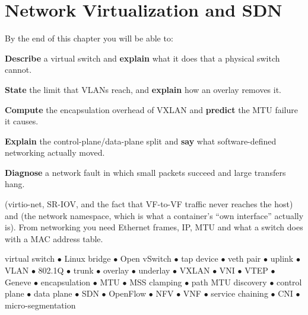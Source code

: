\chapter{Network Virtualization and SDN}\label{ch:network}

\begin{outcomes}
By the end of this chapter you will be able to:
\begin{tight}
  \item \textbf{Describe} a virtual switch and \textbf{explain} what it does
        that a physical switch cannot.
  \item \textbf{State} the limit that VLANs reach, and \textbf{explain} how an
        overlay removes it.
  \item \textbf{Compute} the encapsulation overhead of VXLAN and
        \textbf{predict} the MTU failure it causes.
  \item \textbf{Explain} the control-plane/data-plane split and \textbf{say}
        what software-defined networking actually moved.
  \item \textbf{Diagnose} a network fault in which small packets succeed and
        large transfers hang.
\end{tight}
\end{outcomes}

\begin{prereq}
 (virtio-net, SR-IOV, and the fact that VF-to-VF traffic never
reaches the host) and  (the network namespace, which is what
a container's ``own interface'' actually is). From networking you need Ethernet
frames, IP, MTU and what a switch does with a MAC address table.
\end{prereq}

\begin{keyterms}
virtual switch $\bullet$ Linux bridge $\bullet$ Open vSwitch $\bullet$ tap
device $\bullet$ veth pair $\bullet$ uplink $\bullet$ VLAN $\bullet$ 802.1Q
$\bullet$ trunk $\bullet$ overlay $\bullet$ underlay $\bullet$ VXLAN $\bullet$
VNI $\bullet$ VTEP $\bullet$ Geneve $\bullet$ encapsulation $\bullet$ MTU
$\bullet$ MSS clamping $\bullet$ path MTU discovery $\bullet$ control plane
$\bullet$ data plane $\bullet$ SDN $\bullet$ OpenFlow $\bullet$ NFV $\bullet$
VNF $\bullet$ service chaining $\bullet$ CNI $\bullet$ micro-segmentation
\end{keyterms}


